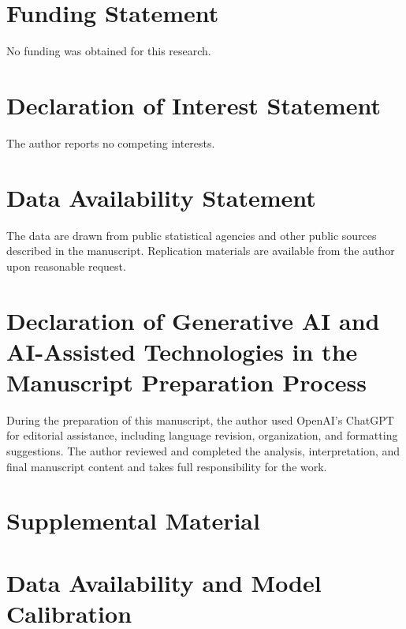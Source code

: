 \documentclass[12pt]{article}
\begin{document}
\section*{Funding Statement}

No funding was obtained for this research.

\section*{Declaration of Interest Statement}

The author reports no competing interests.

\section*{Data Availability Statement}

The data are drawn from public statistical agencies and other public sources described in the manuscript. Replication materials are available from the author upon reasonable request.

\section*{Declaration of Generative AI and AI-Assisted Technologies in the Manuscript Preparation Process}

During the preparation of this manuscript, the author used OpenAI's ChatGPT for editorial assistance, including language revision, organization, and formatting suggestions. The author reviewed and completed the analysis, interpretation, and final manuscript content and takes full responsibility for the work.

\clearpage

\setcounter{section}{0}
\setcounter{table}{0}
\setcounter{figure}{0}

\renewcommand{\thesection}{S\arabic{section}}
\renewcommand{\thetable}{S\arabic{table}}
\renewcommand{\thefigure}{S\arabic{figure}}
\clearpage
\section*{Supplemental Material}

\section{Data Availability and Model Calibration}\label{app:data_calibration}
\end{document}
